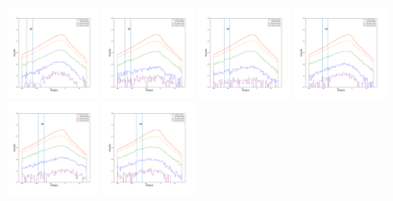 \documentclass[12pt,prd]{article}
\begin{document}
\begin{figure}[h!]
\centering
\includegraphics[width=0.24\textwidth]{../figures/scanning_plotsgaiascan_l22_5_b74_4_ra209_6_dec23_3_npy_0.pdf}
\includegraphics[width=0.24\textwidth]{../figures/scanning_plotsgaiascan_l22_5_b74_4_ra209_6_dec23_3_npy_1.pdf}
\includegraphics[width=0.24\textwidth]{../figures/scanning_plotsgaiascan_l22_5_b74_4_ra209_6_dec23_3_npy_2.pdf}
\includegraphics[width=0.24\textwidth]{../figures/scanning_plotsgaiascan_l22_5_b74_4_ra209_6_dec23_3_npy_3.pdf}
\includegraphics[width=0.24\textwidth]{../figures/scanning_plotsgaiascan_l22_5_b74_4_ra209_6_dec23_3_npy_4.pdf}
\includegraphics[width=0.24\textwidth]{../figures/scanning_plotsgaiascan_l22_5_b74_4_ra209_6_dec23_3_npy_5.pdf}

\end{figure}
\end{document}
